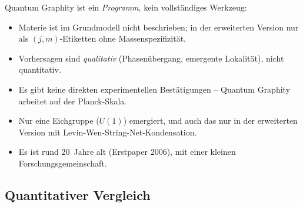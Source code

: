 Quantum Graphity ist ein \emph{Programm}, kein vollständiges Werkzeug:
\begin{itemize}[leftmargin=2em,itemsep=2pt,topsep=2pt]
  \item Materie ist im Grundmodell nicht beschrieben; in der
        erweiterten Version nur als $(j, m)$-Etiketten ohne
        Massenspezifizität.
  \item Vorhersagen sind \emph{qualitativ} (Phasenübergang,
        emergente Lokalität), nicht quantitativ.
  \item Es gibt keine direkten experimentellen Bestätigungen --
        Quantum Graphity arbeitet auf der Planck-Skala.
  \item Nur eine Eichgruppe ($U(1)$) emergiert, und auch das nur in
        der erweiterten Version mit Levin-Wen-String-Net-Kondensation.
  \item Es ist rund 20~Jahre alt (Erstpaper 2006), mit einer kleinen
        Forschungsgemeinschaft.
\end{itemize}

\subsection{Quantitativer Vergleich}

\begin{center}
\renewcommand{\arraystretch}{1.4}
{\small
{}
}
\renewcommand{\arraystretch}{1.0}
\end{center}

